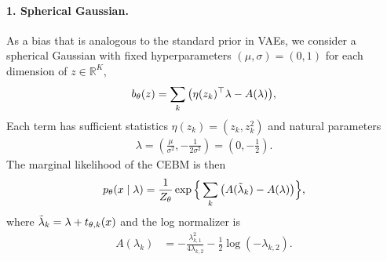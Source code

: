 \documentclass[tablecaption=bottom,wcp]{jmlr} %
\begin{document}
\paragraph{1. Spherical Gaussian.} As a bias that is analogous to the standard prior in VAEs, we consider a spherical Gaussian with fixed hyperparameters $(\mu,\sigma)=(0,1)$ for each dimension of $z \in \mathbb{R}^K$,
\begin{align*}
    b_\theta(z) = \sum_{k} \big( \eta(z_k)^\top \lambda - A(\lambda) \big),
\end{align*}
Each term has sufficient statistics $\eta(z_k) = (z_k, z_k^2)$ and natural parameters
\begin{align}
   \lambda = 
   \left(
      \frac{\mu}{\sigma^2},
      -\frac{1}{2\sigma^2}
   \right)
   =
   \left(
      0,
      -\frac{1}{2}
   \right)
   .
\end{align}
The marginal likelihood of the CEBM is then
\begin{align}
    p_\theta(x \mid \lambda) 
    =
    \frac{1}{Z_\theta}
    \exp \Big\{
      \sum_{k} \big(A(\tilde{\lambda}_k) - A(\lambda)\big)
    \Big\},
\end{align}
where $\tilde{\lambda}_k = \lambda + t_{\theta,k}(x)$ and the log normalizer is
\begin{align*}
    A(\lambda_k) 
    &=
    -\frac{\lambda_{k,1}^2}{4 \lambda_{k,2}}
    -
    \frac{1}{2} \log (-\lambda_{k,2})
    .
\end{align*}
\end{document}
